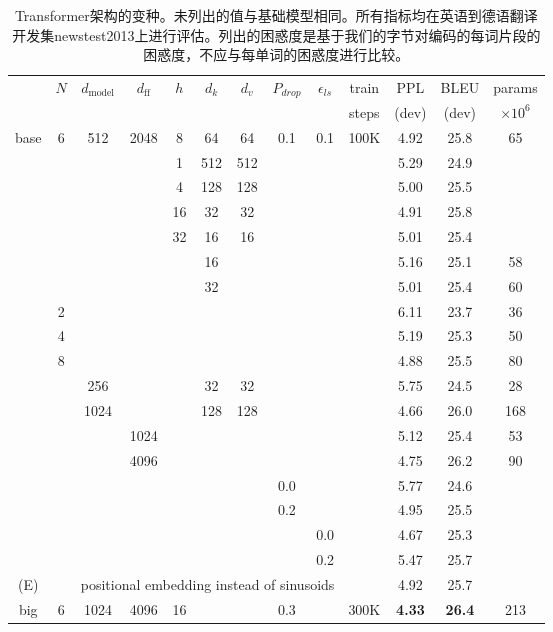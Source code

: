 \documentclass[lang=cn,a4paper,newtx]{elegantpaper}
\newcommand{\dmodel}{d_{\text{model}}}
\newcommand{\dff}{d_{\text{ff}}}
\begin{document}
\begin{table}[t]
\caption{Transformer架构的变种。未列出的值与基础模型相同。所有指标均在英语到德语翻译开发集newstest2013上进行评估。列出的困惑度是基于我们的字节对编码的每词片段的困惑度，不应与每单词的困惑度进行比较。}
\label{tab:variations}
\begin{center}
\vspace{-2mm}
\begin{tabular}{c|ccccccccc|ccc}
\hline\rule{0pt}{2.0ex}
 & \multirow{2}{*}{$N$} & \multirow{2}{*}{$\dmodel$} &
\multirow{2}{*}{$\dff$} & \multirow{2}{*}{$h$} & 
\multirow{2}{*}{$d_k$} & \multirow{2}{*}{$d_v$} & 
\multirow{2}{*}{$P_{drop}$} & \multirow{2}{*}{$\epsilon_{ls}$} &
train & PPL & BLEU & params \\
 & & & & & & & & & steps & (dev) & (dev) & $\times10^6$ \\
\hline\rule{0pt}{2.0ex}
base & 6 & 512 & 2048 & 8 & 64 & 64 & 0.1 & 0.1 & 100K & 4.92 & 25.8 & 65 \\
\hline\rule{0pt}{2.0ex}
\multirow{4}{*}{(A)}
& & & & 1 & 512 & 512 & & & & 5.29 & 24.9 &  \\
& & & & 4 & 128 & 128 & & & & 5.00 & 25.5 &  \\
& & & & 16 & 32 & 32 & & & & 4.91 & 25.8 &  \\
& & & & 32 & 16 & 16 & & & & 5.01 & 25.4 &  \\
\hline\rule{0pt}{2.0ex}
\multirow{2}{*}{(B)}
& & & & & 16 & & & & & 5.16 & 25.1 & 58 \\
& & & & & 32 & & & & & 5.01 & 25.4 & 60 \\
\hline\rule{0pt}{2.0ex}
\multirow{7}{*}{(C)}
& 2 & & & & & & & &            & 6.11 & 23.7 & 36 \\
& 4 & & & & & & & &            & 5.19 & 25.3 & 50 \\
& 8 & & & & & & & &            & 4.88 & 25.5 & 80 \\
& & 256 & & & 32 & 32 & & &    & 5.75 & 24.5 & 28 \\
& & 1024 & & & 128 & 128 & & & & 4.66 & 26.0 & 168 \\
& & & 1024 & & & & & &         & 5.12 & 25.4 & 53 \\
& & & 4096 & & & & & &         & 4.75 & 26.2 & 90 \\
\hline\rule{0pt}{2.0ex}
\multirow{4}{*}{(D)}
& & & & & & & 0.0 & & & 5.77 & 24.6 &  \\
& & & & & & & 0.2 & & & 4.95 & 25.5 &  \\
& & & & & & & & 0.0 & & 4.67 & 25.3 &  \\
& & & & & & & & 0.2 & & 5.47 & 25.7 &  \\
\hline\rule{0pt}{2.0ex}
(E) & & \multicolumn{7}{c}{positional embedding instead of sinusoids} & & 4.92 & 25.7 & \\
\hline\rule{0pt}{2.0ex}
big & 6 & 1024 & 4096 & 16 & & & 0.3 & & 300K & \textbf{4.33} & \textbf{26.4} & 213 \\
\hline
\end{tabular}
\end{center}
\end{table}
\end{document}
